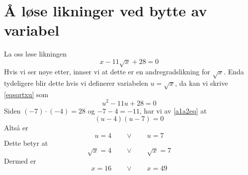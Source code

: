 



	
\section{Å løse likninger ved bytte av variabel} \label{Bytvar}
La oss løse likningen 
\begin{equation}\label{eqsqrtxu}
	x-11\sqrt{x}+28=0
\end{equation}
Hvis vi ser nøye etter, innser vi at dette er en andregradslikning for $ \sqrt{x} $. Enda tydeligere blir dette hvis vi definerer variabelen $ u=\sqrt{x} $, da kan vi skrive \eqref{eqsqrtxu} som
\[ u^2-11u+28=0 \]
Siden $ (-7)\cdot(-4)=28 $ og $ -7-4=-11 $, har vi av \eqref{a1a2eq} at
\[ (u-4)(u-7)=0 \]
Altså er 
\[ u=4 \qquad \vee \qquad u=7 \]
Dette betyr at
\[ \sqrt{x}=4 \qquad \vee \qquad \sqrt{x}=7 \]
Dermed er
\[ x=16 \qquad \vee \qquad x=49 \]

